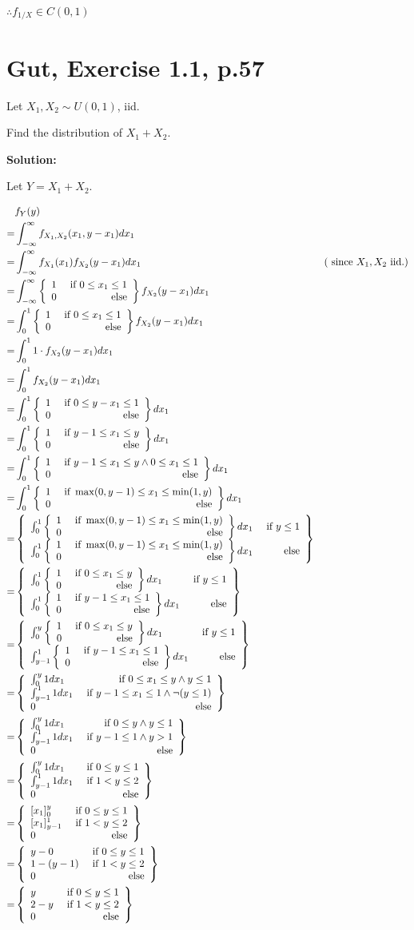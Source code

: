 \documentclass{article}
\begin{document}
\(\therefore f_{1/X}\in C(0,1)\)

\section{Gut, Exercise 1.1, p.57}

Let \(X_1,X_2 \sim U(0,1)\), iid.

Find the distribution of \(X_1+X_2\).

\textbf{Solution:}

Let \(Y=X_1+X_2\).

\begin{align*}
	 & f_Y(y) \\
	=& \int_{-\infty}^\infty f_{X_1,X_2}(x_1,y-x_1)dx_1 \\
	=& \int_{-\infty}^\infty f_{X_1}(x_1)f_{X_2}(y-x_1)dx_1 & (\text{ since } X_1,X_2\text{ iid.}) \\
	=& \int_{-\infty}^\infty \casesii{1}{0\leq x_1 \leq 1}{0}f_{X_2}(y-x_1)dx_1 \\
	=& \int_0^1 \casesii{1}{0\leq x_1 \leq 1}{0}f_{X_2}(y-x_1)dx_1 \\
	=& \int_0^1 1\cdot f_{X_2}(y-x_1)dx_1 \\
	=& \int_0^1 f_{X_2}(y-x_1)dx_1 \\
	=& \int_0^1 \casesii{1}{0\leq y-x_1\leq 1}{0}dx_1 \\
	=& \int_0^1 \casesii{1}{y-1\leq x_1\leq y}{0}dx_1 \\
	=& \int_0^1 \casesii{1}{y-1\leq x_1\leq y\wedge 0\leq x_1 \leq 1}{0}dx_1 \\
	=& \int_0^1 \casesii{1}{\max(0,y-1)\leq x_1\leq \min(1,y)}{0}dx_1 \\
	=& \casesii{\int_0^1 \casesii{1}{\max(0,y-1)\leq x_1\leq \min(1,y)}{0}dx_1}{y \leq 1}{\int_0^1 \casesii{1}{\max(0,y-1)\leq x_1\leq \min(1,y)}{0}dx_1} \\
	=& \casesii{\int_0^1 \casesii{1}{0\leq x_1\leq y}{0}dx_1}{y \leq 1}{\int_0^1 \casesii{1}{y-1\leq x_1\leq 1}{0}dx_1} \\
	=& \casesii{\int_0^y \casesii{1}{0\leq x_1\leq y}{0}dx_1}{y \leq 1}{\int_{y-1}^1 \casesii{1}{y-1\leq x_1\leq 1}{0}dx_1} \\
	=& \casesiii{\int_0^y 1dx_1}{0\leq x_1 \leq y \wedge y\leq 1}{\int_{y-1}^1 1dx_1}{y-1\leq x_1 \leq 1 \wedge \neg(y\leq 1)}{0} \\
	=& \casesiii{\int_0^y 1dx_1}{0\leq y \wedge y\leq 1}{\int_{y-1}^1 1dx_1}{y-1\leq 1 \wedge y>1}{0} \\
	=& \casesiii{\int_0^y 1dx_1}{0\leq y\leq 1}{\int_{y-1}^1 1dx_1}{1<y\leq 2}{0} \\
	=& \casesiii{\hakparen{x_1}_0^y}{0\leq y\leq 1}{\hakparen{x_1}_{y-1}^1}{1<y\leq 2}{0} \\
	=& \casesiii{y-0}{0\leq y\leq 1}{1-(y-1)}{1<y\leq 2}{0} \\
	=& \casesiii{y}{0\leq y\leq 1}{2-y}{1<y\leq 2}{0} \\
\end{align*}
\end{document}
